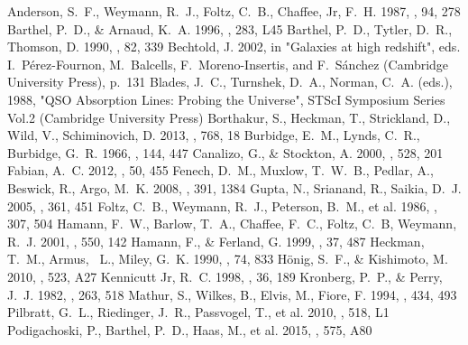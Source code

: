 \documentclass[preprint]{aastex}
\begin{document}
\begin{thebibliography}{}
  Anderson, S.~F., Weymann, R.~J., Foltz, C.~B., Chaffee, Jr, F.~H. 1987,
 \aj, 94, 278
  Barthel, P.~D., \& Arnaud, K.~A. 1996, \mnras, 283, L45
  Barthel, P.~D., Tytler, D.~R., Thomson, D. 1990, \aaps, 82, 339
  Bechtold, J. 2002, in "Galaxies at high redshift", eds.
  I.~P\'erez-Fournon, M.~Balcells, F.~Moreno-Insertis, and F.~S\'anchez
  (Cambridge University Press), p.~131
  Blades, J.~C., Turnshek, D.~A., Norman, C.~A. (eds.), 1988, "QSO Absorption Lines:
  Probing the Universe", STScI Symposium Series Vol.2 (Cambridge University Press)
  Borthakur, S., Heckman, T., Strickland, D., Wild, V., Schiminovich, D. 2013, \apj, 768, 18
  Burbidge, E.~M., Lynds, C.~R., Burbidge, G.~R. 1966, \apj, 144, 447
  Canalizo, G., \& Stockton, A. 2000, \apj, 528, 201
  Fabian, A.~C. 2012, \araa, 50, 455
  Fenech, D.~M., Muxlow, T.~W.~B., Pedlar, A., Beswick, R., Argo, M.~K. 2008,
  \mnras, 391, 1384
  Gupta, N., Srianand, R., Saikia, D.~J. 2005, \mnras, 361, 451 
  Foltz, C.~B., Weymann, R.~J., Peterson, B.~M., et al. 1986, \apj, 307, 504 
  Hamann, F.~W., Barlow, T.~A., Chaffee, F.~C., Foltz, C.~B, Weymann, R.~J. 
  2001, \apj, 550, 142
  Hamann, F., \& Ferland, G. 1999, \araa, 37, 487  
  Heckman, T.~M., Armus, ~L., Miley, G.~K. 1990, \apj, 74, 833
  H\"onig, S.~F., \& Kishimoto, M. 2010, \aap, 523, A27
  Kennicutt Jr, R.~C. 1998, \araa, 36, 189
  Kronberg, P.~P., \& Perry, J.~J. 1982, \apj, 263, 518
  Mathur, S., Wilkes, B., Elvis, M., Fiore, F. 1994, \apj, 434, 493 
  Pilbratt, G.~L., Riedinger, J.~R., Passvogel, T., et al. 2010, \aap, 518, L1
  Podigachoski, P., Barthel, P.~D., Haas, M., et al. 2015, \aap, 575, A80

\end{thebibliography}
\end{document}
